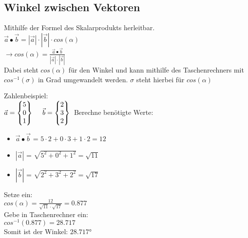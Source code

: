 \subsection{Winkel zwischen Vektoren}
\label{sec:winkel_vektoren}
Mithilfe der Formel des Skalarprodukts herleitbar. \\
$\vec{a} \bullet \vec{b} = |\vec{a}| \cdot |\vec{b}| \cdot cos(\alpha)$ \\
$\rightarrow cos(\alpha) = \frac{\vec{a}\bullet \vec{b}}{|\vec{a}|\cdot |\vec{b}|}$ \\
Dabei steht $cos(\alpha)$ für den Winkel und kann mithilfe des Taschenrechners mit $cos^{-1}(\sigma)$ in Grad umgewandelt werden. 
$\sigma$ steht hierbei für $cos(\alpha)$ 
\par
Zahlenbeispiel: \\
$
\vec{a} = 
\begin{Bmatrix}
    5 \\ 0 \\ 1
\end{Bmatrix} 
\ \ \ \
\vec{b} = 
\begin{Bmatrix}
    2 \\ 3 \\ 2
\end{Bmatrix} \\
$
Berechne benötigte Werte:
\begin{itemize}
    \item $\vec{a} \bullet \vec{b}$ = $5 \cdot 2 + 0 \cdot 3 + 1 \cdot 2 = 12$
    \item $|\vec{a}|$ = $\sqrt{5^2 + 0^2 + 1^2} = \sqrt{11}$
    \item $|\vec{b}|$ = $\sqrt{2^2 + 3^2 + 2^2} = \sqrt{17}$
\end{itemize}
Setze ein: \\
$cos(\alpha) = \frac{12}{\sqrt{11}\cdot \sqrt{17}} = 0.877$ \\
Gebe in Taschenrechner ein: \\
$cos^{-1}(0.877) = 28.717$ \\
Somit ist der Winkel: $28.717$°
